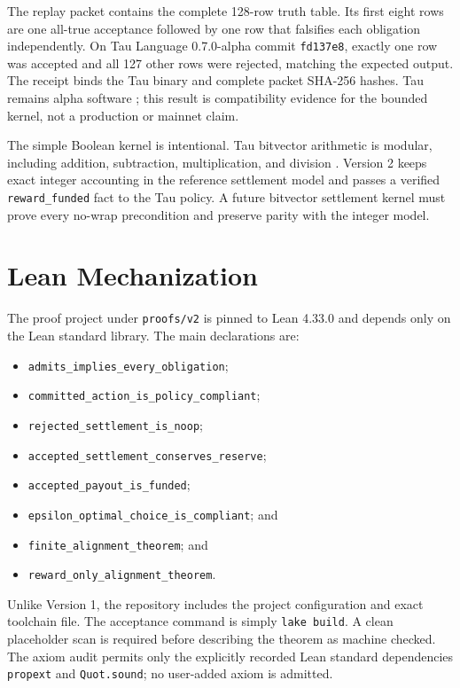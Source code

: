 \documentclass[11pt]{article}
\begin{document}
The replay packet contains the complete 128-row truth table.  Its first eight
rows are one all-true acceptance followed by one row that falsifies each
obligation independently.  On Tau Language 0.7.0-alpha commit
\texttt{fd137e8}, exactly one row was accepted and all 127 other rows were
rejected, matching the expected output.  The receipt binds the Tau binary and
complete packet SHA-256 hashes.  Tau remains alpha software
\cite{taulangcurrent}; this result is compatibility evidence for the bounded
kernel, not a production or mainnet claim.

The simple Boolean kernel is intentional.  Tau bitvector arithmetic is modular,
including addition, subtraction, multiplication, and division
\cite{taulangcurrent}.  Version 2 keeps exact integer accounting in the
reference settlement model and passes a verified \texttt{reward\_funded} fact
to the Tau policy.  A future bitvector settlement kernel must prove every
no-wrap precondition and preserve parity with the integer model.

\section{Lean Mechanization}

The proof project under \texttt{proofs/v2} is pinned to Lean 4.33.0 and depends
only on the Lean standard library.  The main declarations are:

\begin{itemize}
  \item \texttt{admits\_implies\_every\_obligation};
  \item \texttt{committed\_action\_is\_policy\_compliant};
  \item \texttt{rejected\_settlement\_is\_noop};
  \item \texttt{accepted\_settlement\_conserves\_reserve};
  \item \texttt{accepted\_payout\_is\_funded};
  \item \texttt{epsilon\_optimal\_choice\_is\_compliant}; and
  \item \texttt{finite\_alignment\_theorem}; and
  \item \texttt{reward\_only\_alignment\_theorem}.
\end{itemize}

Unlike Version 1, the repository includes the project configuration and exact
toolchain file.  The acceptance command is simply \texttt{lake build}.  A clean
placeholder scan is required before describing the theorem as machine checked.
The axiom audit permits only the explicitly recorded Lean standard dependencies
\texttt{propext} and \texttt{Quot.sound}; no user-added axiom is admitted.
\end{document}
